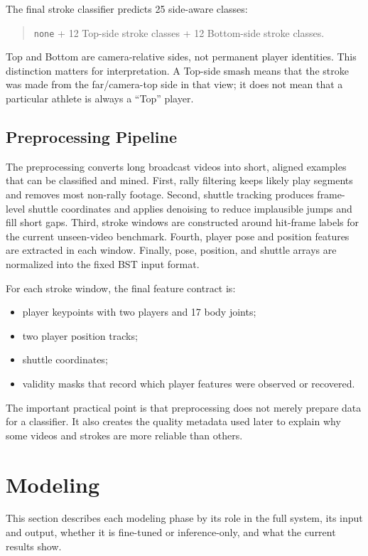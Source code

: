 \documentclass{article}
\begin{document}
The final stroke classifier predicts 25 side-aware classes:
\begin{quote}
\texttt{none} + 12 Top-side stroke classes + 12 Bottom-side stroke classes.
\end{quote}
Top and Bottom are camera-relative sides, not permanent player identities.
This distinction matters for interpretation. A Top-side smash means that the
stroke was made from the far/camera-top side in that view; it does not mean
that a particular athlete is always a ``Top'' player.

\subsection{Preprocessing Pipeline}

The preprocessing converts long broadcast videos into short, aligned examples
that can be classified and mined. First, rally filtering keeps likely play
segments and removes most non-rally footage. Second, shuttle tracking produces
frame-level shuttle coordinates and applies denoising to reduce implausible
jumps and fill short gaps. Third, stroke windows are constructed around
hit-frame labels for the current unseen-video benchmark. Fourth, player pose
and position features are extracted in each window. Finally, pose, position,
and shuttle arrays are normalized into the fixed BST input format.

For each stroke window, the final feature contract is:
\begin{itemize}[leftmargin=*,nosep]
  \item player keypoints with two players and 17 body joints;
  \item two player position tracks;
  \item shuttle coordinates;
  \item validity masks that record which player features were observed or
  recovered.
\end{itemize}

The important practical point is that preprocessing does not merely prepare
data for a classifier. It also creates the quality metadata used later to
explain why some videos and strokes are more reliable than others.

\section{Modeling}

This section describes each modeling phase by its role in the full system, its
input and output, whether it is fine-tuned or inference-only, and what the
current results show.
\end{document}
